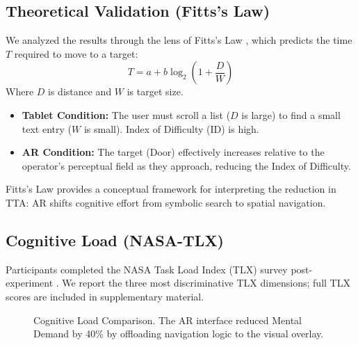 \documentclass[conference]{IEEEtran}
\begin{document}
\subsection{Theoretical Validation (Fitts's Law)}
We analyzed the results through the lens of Fitts's Law \cite{b17}, which predicts the time $T$ required to move to a target:
\begin{equation}
T = a + b \log_2 \left( 1 + \frac{D}{W} \right)
\end{equation}
Where $D$ is distance and $W$ is target size.
\begin{itemize}
    \item \textbf{Tablet Condition:} The user must scroll a list ($D$ is large) to find a small text entry ($W$ is small). Index of Difficulty (ID) is high.
    \item \textbf{AR Condition:} The target (Door) effectively increases relative to the operator's perceptual field as they approach, reducing the Index of Difficulty.
\end{itemize}
Fitts's Law provides a conceptual framework for interpreting the reduction in TTA: AR shifts cognitive effort from symbolic search to spatial navigation.

\subsection{Cognitive Load (NASA-TLX)}
Participants completed the NASA Task Load Index (TLX) survey post-experiment \cite{b8}. We report the three most discriminative TLX dimensions; full TLX scores are included in supplementary material.



\begin{figure}[htbp]
\centering
{}
\caption{Cognitive Load Comparison. The AR interface reduced Mental Demand by 40\% by offloading navigation logic to the visual overlay.}
\label{fig:tlx}
\end{figure}
\end{document}
